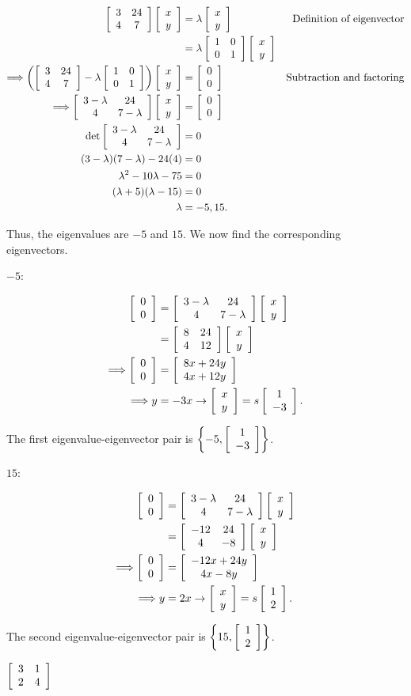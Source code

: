 \documentclass[../key.tex]{subfiles}
\begin{document}
\begin{align*}
\twomat{3}{24}{4}{7}\twovec{x}{y} &= \lambda\twovec{x}{y} & \text{Definition of eigenvector} \\
&= \lambda\twomat{1}{0}{0}{1}\twovec{x}{y} \\
\Longrightarrow \left(\twomat{3}{24}{4}{7}-\lambda\twomat{1}{0}{0}{1}\right)\twovec{x}{y}&=\twovec{0}{0} & \text{Subtraction and factoring} \\
\Longrightarrow \twomat{3-\lambda}{24}{4}{7-\lambda}\twovec{x}{y} &= \twovec{0}{0} \\
\det \twomat{3-\lambda}{24}{4}{7-\lambda} &= 0 \\
(3-\lambda)(7-\lambda)-24(4) &= 0 \\
\lambda^2 - 10\lambda - 75 &= 0 \\
(\lambda+5)(\lambda-15) &= 0 \\
\lambda &= -5,15.\\
\end{align*}

Thus, the eigenvalues are $-5$ and $15$. We now find the corresponding eigenvectors.

$-5$:

\begin{align*}
\twovec{0}{0} &= \twomat{3-\lambda}{24}{4}{7-\lambda}\twovec{x}{y} \\
&= \twomat{8}{24}{4}{12}\twovec{x}{y} \\
\Longrightarrow \twovec{0}{0} &= \twovec{8x+24y}{4x+12y} \\
\Longrightarrow y&=-3x \rightarrow \twovec{x}{y}=s\twovec{1}{-3}.
\end{align*}

The first eigenvalue-eigenvector pair is $\left\{-5, \twovec{1}{-3}\right\}$.

$15$:

\begin{align*}
\twovec{0}{0} &= \twomat{3-\lambda}{24}{4}{7-\lambda}\twovec{x}{y} \\
&= \twomat{-12}{24}{4}{-8}\twovec{x}{y} \\
\Longrightarrow \twovec{0}{0} &= \twovec{-12x+24y}{4x-8y} \\
\Longrightarrow y&=2x \rightarrow \twovec{x}{y}=s\twovec{1}{2}.
\end{align*}

The second eigenvalue-eigenvector pair is $\left\{15, \twovec{1}{2}\right\}$.

\begin{inner_problem}
\item $\twomat{3}{1}{2}{4}$
\end{inner_problem}
\end{document}

